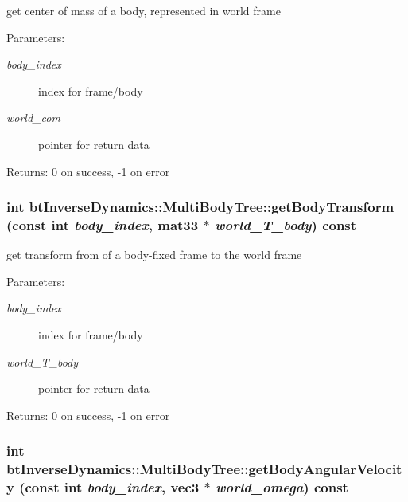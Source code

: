 get center of mass of a body, represented in world frame \begin{Desc}
\item[Parameters:]
\begin{description}
\item[{\em body\_\-index}]index for frame/body \item[{\em world\_\-com}]pointer for return data \end{description}
\end{Desc}
\begin{Desc}
\item[Returns:]0 on success, -1 on error \end{Desc}
\hypertarget{classbt_inverse_dynamics_1_1_multi_body_tree_582514119940a8dcc10d06cd97019143}{
\subsubsection[getBodyTransform]{\setlength{\rightskip}{0pt plus 5cm}int btInverseDynamics::MultiBodyTree::getBodyTransform (const int {\em body\_\-index}, \/  mat33 $\ast$ {\em world\_\-T\_\-body}) const}}
\label{classbt_inverse_dynamics_1_1_multi_body_tree_582514119940a8dcc10d06cd97019143}


get transform from of a body-fixed frame to the world frame \begin{Desc}
\item[Parameters:]
\begin{description}
\item[{\em body\_\-index}]index for frame/body \item[{\em world\_\-T\_\-body}]pointer for return data \end{description}
\end{Desc}
\begin{Desc}
\item[Returns:]0 on success, -1 on error \end{Desc}
\hypertarget{classbt_inverse_dynamics_1_1_multi_body_tree_441236989196e2c5f7219f420ddc6620}{
\subsubsection[getBodyAngularVelocity]{\setlength{\rightskip}{0pt plus 5cm}int btInverseDynamics::MultiBodyTree::getBodyAngularVelocity (const int {\em body\_\-index}, \/  {\bf vec3} $\ast$ {\em world\_\-omega}) const}}
\label{classbt_inverse_dynamics_1_1_multi_body_tree_441236989196e2c5f7219f420ddc6620}



